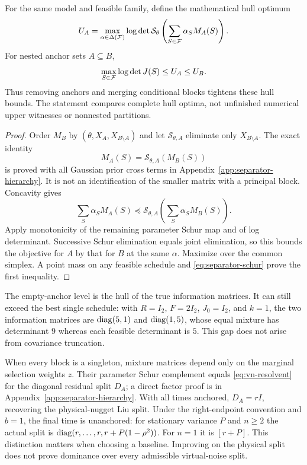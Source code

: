 \begin{theorem}\label{thm:separator-hierarchy}
For the same model and feasible family, define the mathematical hull optimum
\[
 U_A=\max_{\alpha\in\Delta(\mathcal F)}
 \log\det\mathcal S_\theta\left(\sum_{S\in\mathcal F}\alpha_SM_A(S)\right).
\]
For nested anchor sets $A\subseteq B$,
\begin{equation}\label{eq:separator-order}
 \max_{S\in\mathcal F}\log\det J(S)\le U_A\le U_B.
\end{equation}
Thus removing anchors and merging conditional blocks tightens these hull
bounds. The statement compares complete hull optima, not unfinished
numerical upper witnesses or nonnested partitions.
\end{theorem}
\begin{proof}
Order $M_B$ by $(\theta,X_A,X_{B\setminus A})$ and let
$\mathcal S_{\theta,A}$ eliminate only $X_{B\setminus A}$.
The exact identity
\begin{equation}\label{eq:separator-cross-identity}
 M_A(S)=\mathcal S_{\theta,A}(M_B(S))
\end{equation}
is proved with all Gaussian prior cross terms in
Appendix~\ref{app:separator-hierarchy}. It is not an identification of the
smaller matrix with a principal block. Concavity gives
\[
 \sum_S\alpha_SM_A(S)\preceq
 \mathcal S_{\theta,A}\left(\sum_S\alpha_SM_B(S)\right).
\]
Apply monotonicity of the remaining parameter Schur map and of log
determinant. Successive Schur elimination equals joint elimination, so this
bounds the objective for $A$ by that for $B$ at the same $\alpha$.
Maximize over the common simplex. A point mass on any feasible schedule and
\eqref{eq:separator-schur} prove the first inequality.
\end{proof}

The empty-anchor level is the hull of the true information matrices. It can
still exceed the best single schedule: with $R=I_2$, $F=2I_2$,
$J_0=I_2$, and $k=1$, the two information matrices are
$\operatorname{diag}(5,1)$ and $\operatorname{diag}(1,5)$, whose equal mixture has determinant $9$
whereas each feasible determinant is $5$. This gap does not arise from
covariance truncation.

When every block is a singleton, mixture matrices depend only on the
marginal selection weights $z$. Their parameter Schur complement equals
\eqref{eq:vn-resolvent} for the diagonal residual split $D_A$; a direct
factor proof is in Appendix~\ref{app:separator-hierarchy}. With all times
anchored, $D_A=rI$, recovering the physical-nugget Liu split. Under the
right-endpoint convention and $b=1$, the final time is unanchored: for
stationary variance $P$ and $n\ge2$ the actual split is
$\operatorname{diag}(r,\ldots,r,r+P(1-\rho^2))$. For $n=1$ it is $[r+P]$.
This distinction matters when choosing a baseline. Improving on the physical
split does not prove dominance over every admissible virtual-noise split.

